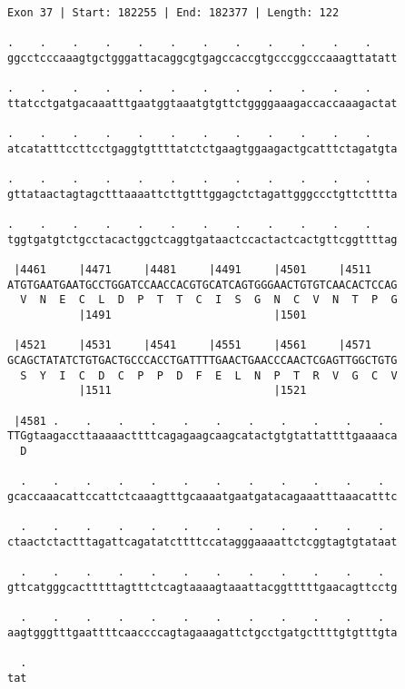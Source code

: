 \documentclass{article}
\begin{document}
\begin{Verbatim}[fontfamily=courier]
Exon 37 | Start: 182255 | End: 182377 | Length: 122

.    .    .    .    .    .    .    .    .    .    .    .    
ggcctcccaaagtgctgggattacaggcgtgagccaccgtgcccggcccaaagttatatt

.    .    .    .    .    .    .    .    .    .    .    .    
ttatcctgatgacaaatttgaatggtaaatgtgttctggggaaagaccaccaaagactat

.    .    .    .    .    .    .    .    .    .    .    .    
atcatatttccttcctgaggtgttttatctctgaagtggaagactgcatttctagatgta

.    .    .    .    .    .    .    .    .    .    .    .    
gttataactagtagctttaaaattcttgtttggagctctagattgggccctgttctttta

.    .    .    .    .    .    .    .    .    .    .    .    
tggtgatgtctgcctacactggctcaggtgataactccactactcactgttcggttttag

 |4461     |4471     |4481     |4491     |4501     |4511    
ATGTGAATGAATGCCTGGATCCAACCACGTGCATCAGTGGGAACTGTGTCAACACTCCAG
  V  N  E  C  L  D  P  T  T  C  I  S  G  N  C  V  N  T  P  G
           |1491                         |1501              

 |4521     |4531     |4541     |4551     |4561     |4571    
GCAGCTATATCTGTGACTGCCCACCTGATTTTGAACTGAACCCAACTCGAGTTGGCTGTG
  S  Y  I  C  D  C  P  P  D  F  E  L  N  P  T  R  V  G  C  V
           |1511                         |1521              

 |4581 .    .    .    .    .    .    .    .    .    .    .  
TTGgtaagaccttaaaaacttttcagagaagcaagcatactgtgtattattttgaaaaca
  D                                                         

  .    .    .    .    .    .    .    .    .    .    .    .  
gcaccaaacattccattctcaaagtttgcaaaatgaatgatacagaaatttaaacatttc

  .    .    .    .    .    .    .    .    .    .    .    .  
ctaactctactttagattcagatatcttttccatagggaaaattctcggtagtgtataat

  .    .    .    .    .    .    .    .    .    .    .    .  
gttcatgggcactttttagtttctcagtaaaagtaaattacggtttttgaacagttcctg

  .    .    .    .    .    .    .    .    .    .    .    .  
aagtgggtttgaattttcaaccccagtagaaagattctgcctgatgcttttgtgtttgta

  .
tat
\end{Verbatim}
\newpage
\end{document}
